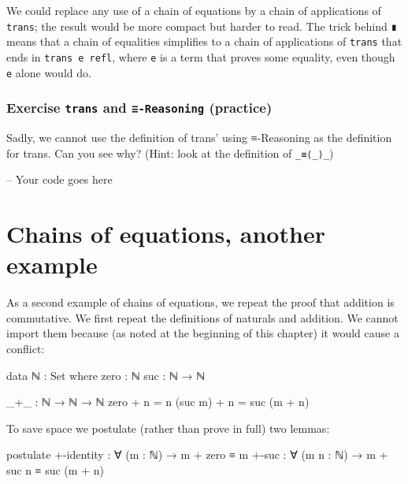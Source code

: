 We could replace any use of a chain of equations by a chain of
applications of \texttt{trans}; the result would be more compact but
harder to read. The trick behind \texttt{∎} means that a chain of
equalities simplifies to a chain of applications of \texttt{trans} that
ends in \texttt{trans\ e\ refl}, where \texttt{e} is a term that proves
some equality, even though \texttt{e} alone would do.

\hypertarget{exercise-trans-and--reasoning-practice}{%
\subsubsection{\texorpdfstring{Exercise \texttt{trans} and
\texttt{≡-Reasoning}
(practice)}{Exercise trans and ≡-Reasoning (practice)}}\label{exercise-trans-and--reasoning-practice}}

Sadly, we cannot use the definition of trans' using ≡-Reasoning as the
definition for trans. Can you see why? (Hint: look at the definition of
\texttt{\_≡⟨\_⟩\_})

\begin{fence}
\begin{code}
-- Your code goes here
\end{code}
\end{fence}

\hypertarget{chains-of-equations-another-example}{%
\section{Chains of equations, another
example}\label{chains-of-equations-another-example}}

As a second example of chains of equations, we repeat the proof that
addition is commutative. We first repeat the definitions of naturals and
addition. We cannot import them because (as noted at the beginning of
this chapter) it would cause a conflict:

\begin{fence}
\begin{code}
data ℕ : Set where
  zero : ℕ
  suc  : ℕ → ℕ

_+_ : ℕ → ℕ → ℕ
zero    + n  =  n
(suc m) + n  =  suc (m + n)
\end{code}
\end{fence}

To save space we postulate (rather than prove in full) two lemmas:

\begin{fence}
\begin{code}
postulate
  +-identity : ∀ (m : ℕ) → m + zero ≡ m
  +-suc : ∀ (m n : ℕ) → m + suc n ≡ suc (m + n)
\end{code}
\end{fence}

